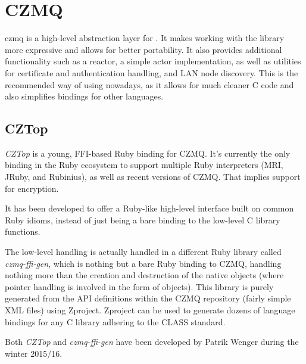 \section{CZMQ}
\gls{czmq} is a high-level abstraction layer for \zmq. It makes working with the \zmq
library more expressive and allows for better portability. It also provides
additional functionality such as a reactor, a simple actor implementation, as
well as utilities for certificate and authentication handling, and LAN node
discovery. This is the recommended way of using \zmq nowadays, as it allows for
much cleaner C code and also simplifies bindings for other languages.

\subsection{CZTop}
\emph{CZTop} is a young, \gls{FFI}-based Ruby binding for CZMQ. It's currently
the only binding in the Ruby ecosystem to support multiple Ruby interpreters
(\gls{MRI}, \gls{JRuby}, and \gls{Rubinius}), as well as recent versions of
CZMQ. That implies support for encryption.

It has been developed to offer a Ruby-like high-level interface built on common
Ruby idioms, instead of just being a bare binding to the low-level C library
functions.

The low-level handling is actually handled in a different Ruby library called
\emph{czmq-ffi-gen}, which is nothing but a bare Ruby binding to CZMQ, handling
nothing more than the creation and destruction of the native objects (where
pointer handling is involved in the form of  objects). This
library is purely generated from the API definitions within the CZMQ repository
(fairly simple XML files) using Zproject. Zproject can be used to generate
dozens of language bindings for any C library adhering to the \gls{CLASS}
standard.

Both \emph{CZTop} and \emph{czmq-ffi-gen} have been developed by Patrik Wenger
during the winter 2015/16.
